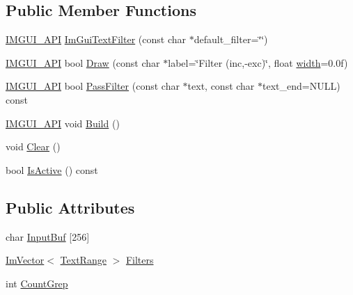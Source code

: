 \subsection*{Public Member Functions}
\begin{DoxyCompactItemize}
\item 
\mbox{\hyperlink{imgui_8h_a43829975e84e45d1149597467a14bbf5}{I\+M\+G\+U\+I\+\_\+\+A\+PI}} \mbox{\hyperlink{struct_im_gui_text_filter_a0a61ee76f0b4f3c354791734b06e3140}{Im\+Gui\+Text\+Filter}} (const char $\ast$default\+\_\+filter=\char`\"{}\char`\"{})
\item 
\mbox{\hyperlink{imgui_8h_a43829975e84e45d1149597467a14bbf5}{I\+M\+G\+U\+I\+\_\+\+A\+PI}} bool \mbox{\hyperlink{struct_im_gui_text_filter_ab93ad5985019ff9d3781606551fc26cc}{Draw}} (const char $\ast$label=\char`\"{}Filter (inc,-\/exc)\char`\"{}, float \mbox{\hyperlink{graphics_8cpp_a2474a5474cbff19523a51eb1de01cda4}{width}}=0.\+0f)
\item 
\mbox{\hyperlink{imgui_8h_a43829975e84e45d1149597467a14bbf5}{I\+M\+G\+U\+I\+\_\+\+A\+PI}} bool \mbox{\hyperlink{struct_im_gui_text_filter_a88d73ff8b81fbbd0a129b1bf3498d8aa}{Pass\+Filter}} (const char $\ast$text, const char $\ast$text\+\_\+end=N\+U\+LL) const
\item 
\mbox{\hyperlink{imgui_8h_a43829975e84e45d1149597467a14bbf5}{I\+M\+G\+U\+I\+\_\+\+A\+PI}} void \mbox{\hyperlink{struct_im_gui_text_filter_aef362baafaa9dfa62d11bc6101c0f4c1}{Build}} ()
\item 
void \mbox{\hyperlink{struct_im_gui_text_filter_a9043c1f0c33d29e6fc9b75ae81f9705a}{Clear}} ()
\item 
bool \mbox{\hyperlink{struct_im_gui_text_filter_a493158f2ab8f45fcf303c3f953be9b88}{Is\+Active}} () const
\end{DoxyCompactItemize}
\subsection*{Public Attributes}
\begin{DoxyCompactItemize}
\item 
char \mbox{\hyperlink{struct_im_gui_text_filter_ad070acb1038199dd4e8f5d010c5cb5ba}{Input\+Buf}} \mbox{[}256\mbox{]}
\item 
\mbox{\hyperlink{class_im_vector}{Im\+Vector}}$<$ \mbox{\hyperlink{struct_im_gui_text_filter_1_1_text_range}{Text\+Range}} $>$ \mbox{\hyperlink{struct_im_gui_text_filter_a5a930a339a9384e6bfadfa56a7c111fd}{Filters}}
\item 
int \mbox{\hyperlink{struct_im_gui_text_filter_ac31839c319fe4211c21fc143b7249f86}{Count\+Grep}}
\end{DoxyCompactItemize}


